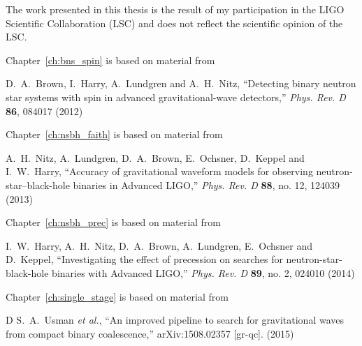 The work presented in this thesis is the result of my participation in the
LIGO Scientific Collaboration (LSC) and does not reflect the
scientific opinion of the LSC.

\vspace*{0.5cm}

\noindent Chapter~\ref{ch:bns_spin} is based on material from

\vspace*{0.25cm}

\noindent   D.~A.~Brown, I.~Harry, A.~Lundgren and A.~H.~Nitz,
``Detecting binary neutron star systems with spin in advanced gravitational-wave detectors,''
{\it Phys. Rev. D} {\bf 86}, 084017 (2012)

\vspace*{0.5cm}

\noindent Chapter~\ref{ch:nsbh_faith} is based on material from

\vspace*{0.25cm}

\noindent    A.~H.~Nitz, A.~Lundgren, D.~A.~Brown, E.~Ochsner, D.~Keppel and I.~W.~Harry,
``Accuracy of gravitational waveform models for observing neutron-star–black-hole binaries in Advanced LIGO,''
{\it Phys. Rev. D} {\bf 88}, no. 12, 124039 (2013)
\vspace*{0.5cm}

\noindent Chapter~\ref{ch:nsbh_prec} is based on material from

\vspace*{0.25cm}

\noindent   I.~W.~Harry, A.~H.~Nitz, D.~A.~Brown, A.~Lundgren, E.~Ochsner and D.~Keppel,
``Investigating the effect of precession on searches for neutron-star-black-hole binaries with Advanced LIGO,''
{\it Phys. Rev. D} {\bf 89}, no. 2, 024010 (2014)

\vspace*{0.5cm}

\noindent Chapter~\ref{ch:single_stage} is based on material from

\vspace*{0.25cm}

\noindent D  S.~A.~Usman {\it et al.}, ``An improved pipeline to search for gravitational waves from compact binary coalescence,''
 arXiv:1508.02357 [gr-qc]. (2015)

\vspace*{0.5cm}

